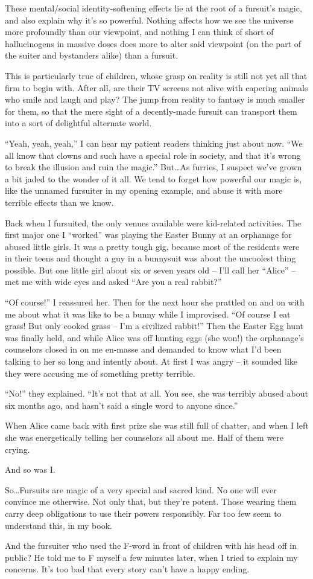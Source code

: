 These mental/social identity-softening effects lie at the root of a fursuit's magic, and also explain why it's so powerful. Nothing affects how we see the universe more profoundly than our viewpoint, and nothing I can think of short of hallucinogens in massive doses does more to alter said viewpoint (on the part of the suiter and bystanders alike) than a fursuit.

This is particularly true of children, whose grasp on reality is still not yet all that firm to begin with. After all, are their TV screens not alive with capering animals who smile and laugh and play? The jump from reality to fantasy is much smaller for them, so that the mere sight of a decently-made fursuit can transport them into a sort of delightful alternate world.

``Yeah, yeah, yeah,'' I can hear my patient readers thinking just about now. ``We all know that clowns and such have a special role in society, and that it's wrong to break the illusion and ruin the magic.'' But\ldots As furries, I suspect we've grown a bit jaded to the wonder of it all. We tend to forget how powerful our magic is, like the unnamed fursuiter in my opening example, and abuse it with more terrible effects than we know.

Back when I fursuited, the only venues available were kid-related activities. The first major one I ``worked'' was playing the Easter Bunny at an orphanage for abused little girls. It was a pretty tough gig, because most of the residents were in their teens and thought a guy in a bunnysuit was about the uncoolest thing possible. But one little girl about six or seven years old -- I'll call her ``Alice'' -- met me with wide eyes and asked ``Are you a real rabbit?''

``Of course!'' I reassured her. Then for the next hour she prattled on and on with me about what it was like to be a bunny while I improvised. ``Of course I eat grass! But only cooked grass -- I'm a civilized rabbit!'' Then the Easter Egg hunt was finally held, and while Alice was off hunting eggs (she won!) the orphanage's counselors closed in on me en-masse and demanded to know what I'd been talking to her so long and intently about. At first I was angry -- it sounded like they were accusing me of something pretty terrible.

``No!'' they explained. ``It's not that at all. You see, she was terribly abused about six months ago, and hasn't said a single word to anyone since.''

When Alice came back with first prize she was still full of chatter, and when I left she was energetically telling her counselors all about me. Half of them were crying.

And so was I.

So\ldots Fursuits are magic of a very special and sacred kind. No one will ever convince me otherwise. Not only that, but they're potent. Those wearing them carry deep obligations to use their powers responsibly. Far too few seem to understand this, in my book.

And the fursuiter who used the F-word in front of children with his head off in public? He told me to F myself a few minutes later, when I tried to explain my concerns. It's too bad that every story can't have a happy ending.
